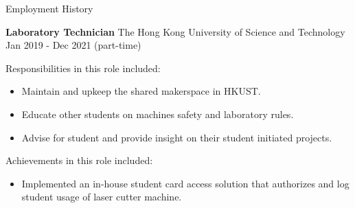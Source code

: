 \documentclass{resume} %
\begin{document}
\begin{rSection}{Employment History}
    
    \item \textbf{Laboratory Technician} {The Hong Kong University of Science and Technology} \hfill Jan 2019 - Dec 2021 (part-time) \\
    
    \hspace*{1cm}%
    \begin{minipage}{.8\textwidth}%
        
        Responsibilities in this role included:
        \begin{itemize}
            \item Maintain and upkeep the shared makerspace in HKUST.
            \item Educate other students on machines safety and laboratory rules.
            \item Advise for student and provide insight on their student initiated projects.
        \end{itemize}
        
        Achievements in this role included:
        \begin{itemize}
            \item Implemented an in-house student card access solution that authorizes and log student usage of laser cutter machine.
        \end{itemize}
        
    \end{minipage}%
\end{rSection}

\end{document}
